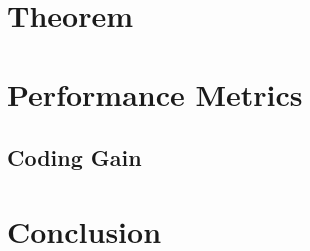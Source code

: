 \documentclass[10pt,twocolumn,twoside]{IEEEtran}
\begin{document}
\section{Theorem}
\section{Performance Metrics}
\subsection{Coding Gain}
\section{Conclusion}



\end{document}
